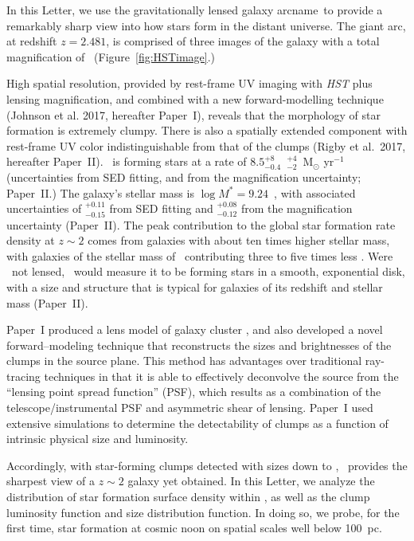 In this Letter, we use the gravitationally lensed galaxy 
arcname\ to provide a 
remarkably sharp view into how stars form in the distant universe.
The giant arc, at redshift $z=2.481$, is comprised of three images of the galaxy with a 
total magnification of \totalmagnification\  (Figure~\ref{fig:HSTimage}.) 

High spatial resolution, provided by rest-frame UV imaging with \textit{HST} plus 
lensing magnification,  and combined with a new forward-modelling technique 
(Johnson et al. 2017, hereafter Paper~I),
reveals that the morphology of star formation is extremely clumpy.  
There is also a spatially extended component with rest-frame UV color indistinguishable 
from that of the clumps  (Rigby et al.\ 2017, hereafter Paper~II).
\arcname\ is forming stars at a rate of  $8.5$$^{+8}_{-0.4}$~$^{+4}_{-2}$~M$_{\odot}$ yr$^{-1}$ 
(uncertainties from SED fitting, and from the magnification uncertainty; Paper~II.)
The galaxy's stellar mass is $\log M^* = 9.24$~\Msol, with associated uncertainties of 
 $^{+0.11}_{-0.15}$  from SED fitting and 
$^{+0.08}_{-0.12}$ from the magnification uncertainty (Paper~II).
The peak contribution to the global star formation rate density at $z\sim2$ comes 
from galaxies with about ten times higher stellar mass, with galaxies of the stellar 
mass of \arcname\ contributing three to five times less \citep{Leja:2015fx}.
Were \arcname\ not lensed, \hst\ would measure it to 
be forming stars in a smooth, exponential disk, with a size and structure that is 
typical for galaxies of its redshift and stellar mass (Paper~II).

Paper~I produced a lens model of 
galaxy cluster \cluster, and also 
developed a novel forward--modeling technique that reconstructs 
the sizes and brightnesses of the clumps in the source plane.  This method has 
advantages over traditional ray-tracing techniques in that it is able 
to effectively deconvolve the source from the ``lensing point spread function'' (PSF),
which results as a combination of the telescope/instrumental PSF and
asymmetric shear of lensing.  
Paper~I used extensive simulations to determine the 
detectability of clumps as a function of intrinsic physical size and luminosity.  

Accordingly, with star-forming clumps detected with sizes down to \smallestscale, 
\arcname\ provides the sharpest view of a $z\sim2$ galaxy yet obtained.
In this Letter, %
we analyze the distribution of star formation surface density within \arcname, 
as well as the clump luminosity function and size distribution function.
In doing so, we probe, for the first time, 
star formation at cosmic noon on spatial scales well below 100~pc.

